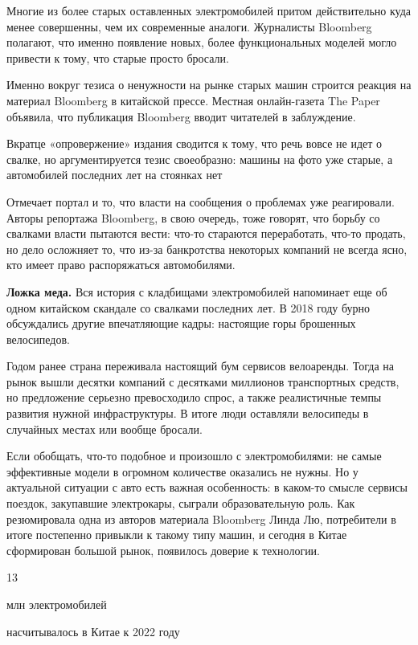 Многие из более старых оставленных электромобилей притом действительно куда менее совершенны, чем их современные аналоги. Журналисты Bloomberg полагают, что именно появление новых, более функциональных моделей могло привести к тому, что старые просто бросали.

Именно вокруг тезиса о ненужности на рынке старых машин строится реакция на материал Bloomberg в китайской прессе. Местная онлайн-газета The Paper объявила, что публикация Bloomberg вводит читателей в заблуждение.

\vspace*{1em}
\begin{center}
    {\Large Вкратце «опровержение» издания сводится к тому, что речь вовсе не идет о свалке, но аргументируется тезис своеобразно: машины на фото уже старые, а автомобилей последних лет на стоянках нет}
\end{center}
\vspace*{1em}

Отмечает портал и то, что власти на сообщения о проблемах уже реагировали. Авторы репортажа Bloomberg, в свою очередь, тоже говорят, что борьбу со свалками власти пытаются вести: что-то стараются переработать, что-то продать, но дело осложняет то, что из-за банкротства некоторых компаний не всегда ясно, кто имеет право распоряжаться автомобилями.

\textbf{Ложка меда.} Вся история с кладбищами электромобилей напоминает еще об одном китайском скандале со свалками последних лет. В 2018 году бурно обсуждались другие впечатляющие кадры: настоящие горы брошенных велосипедов.

Годом ранее страна переживала настоящий бум сервисов велоаренды. Тогда на рынок вышли десятки компаний с десятками миллионов транспортных средств, но предложение серьезно превосходило спрос, а также реалистичные темпы развития нужной инфраструктуры. В итоге люди оставляли велосипеды в случайных местах или вообще бросали.

Если обобщать, что-то подобное и произошло с электромобилями: не самые эффективные модели в огромном количестве оказались не нужны. Но у актуальной ситуации с авто есть важная особенность: в каком-то смысле сервисы поездок, закупавшие электрокары, сыграли образовательную роль. Как резюмировала одна из авторов материала Bloomberg Линда Лю, потребители в итоге постепенно привыкли к такому типу машин, и сегодня в Китае сформирован большой рынок, появилось доверие к технологии.

\vspace*{1em}
\begin{center}
    {\Huge 13}

    {\Large млн электромобилей}

    насчитывалось в Китае к 2022 году
\end{center}
\vspace*{1em}

